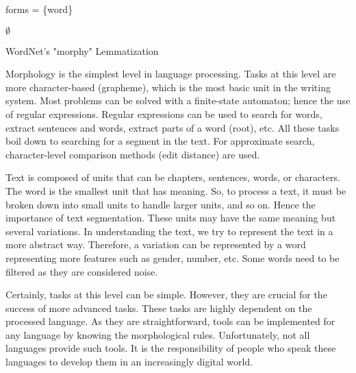 \documentclass{KBook}
\begin{document}
\begin{algorithm}[H]
	
	
	forms = \{word\}
	
	
	\Return $ \emptyset $\;
	
	\caption{WordNet's "morphy" Lemmatization \label{algo:morphy}}
	
\end{algorithm}


Morphology is the simplest level in language processing. Tasks at this level are more character-based (grapheme), which is the most basic unit in the writing system. Most problems can be solved with a finite-state automaton; hence the use of regular expressions. Regular expressions can be used to search for words, extract sentences and words, extract parts of a word (root), etc. All these tasks boil down to searching for a segment in the text. For approximate search, character-level comparison methods (edit distance) are used.

Text is composed of units that can be chapters, sentences, words, or characters. The word is the smallest unit that has meaning. So, to process a text, it must be broken down into small units to handle larger units, and so on. Hence the importance of text segmentation. These units may have the same meaning but several variations. In understanding the text, we try to represent the text in a more abstract way. Therefore, a variation can be represented by a word representing more features such as gender, number, etc. Some words need to be filtered as they are considered noise.

Certainly, tasks at this level can be simple. However, they are crucial for the success of more advanced tasks. These tasks are highly dependent on the processed language. As they are straightforward, tools can be implemented for any language by knowing the morphological rules. Unfortunately, not all languages provide such tools. It is the responsibility of people who speak these languages to develop them in an increasingly digital world.
\end{document}
